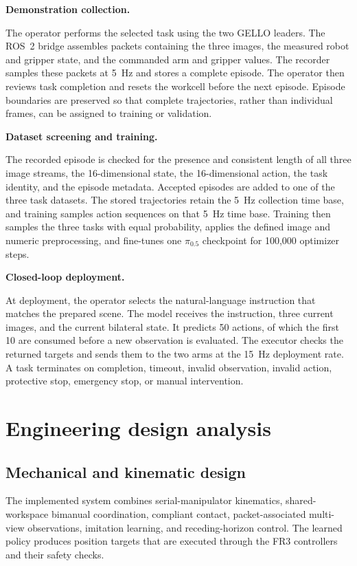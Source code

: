 \medskip
\noindent\textbf{Demonstration collection.}

The operator performs the selected task using the two GELLO leaders. The ROS~2 bridge assembles packets containing the three images, the measured robot and gripper state, and the commanded arm and gripper values. The recorder samples these packets at 5~Hz and stores a complete episode. The operator then reviews task completion and resets the workcell before the next episode. Episode boundaries are preserved so that complete trajectories, rather than individual frames, can be assigned to training or validation.

\medskip
\noindent\textbf{Dataset screening and training.}

The recorded episode is checked for the presence and consistent length of all three image streams, the 16-dimensional state, the 16-dimensional action, the task identity, and the episode metadata. Accepted episodes are added to one of the three task datasets. The stored trajectories retain the 5~Hz collection time base, and training samples action sequences on that 5~Hz time base. Training then samples the three tasks with equal probability, applies the defined image and numeric preprocessing, and fine-tunes one $\pi_{0.5}$ checkpoint for 100,000 optimizer steps.

\medskip
\noindent\textbf{Closed-loop deployment.}

At deployment, the operator selects the natural-language instruction that matches the prepared scene. The model receives the instruction, three current images, and the current bilateral state. It predicts 50 actions, of which the first 10 are consumed before a new observation is evaluated. The executor checks the returned targets and sends them to the two arms at the 15~Hz deployment rate. A task terminates on completion, timeout, invalid observation, invalid action, protective stop, emergency stop, or manual intervention.

\section{Engineering design analysis}

\subsection{Mechanical and kinematic design}

The implemented system combines serial-manipulator kinematics, shared-workspace bimanual coordination, compliant contact, packet-associated multi-view observations, imitation learning, and receding-horizon control. The learned policy produces position targets that are executed through the FR3 controllers and their safety checks.

